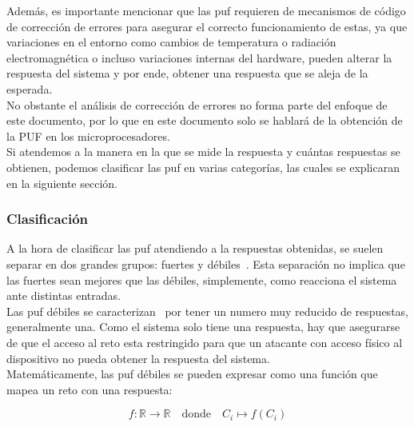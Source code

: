 \documentclass[spanish]{template/minim}
\begin{document}
Además, es importante mencionar que las \gls{puf} requieren de mecanismos de código de corrección de errores para asegurar el correcto funcionamiento de estas, ya que variaciones en el entorno como cambios de temperatura o radiación electromagnética o incluso variaciones internas del hardware, pueden alterar la respuesta del sistema y por ende, obtener una respuesta que se aleja de la esperada.\\

No obstante el análisis de corrección de errores no forma parte del enfoque de este documento, por lo que en este documento solo se hablará de la obtención de la PUF en los microprocesadores.\\

Si atendemos a la manera en la que se mide la respuesta y cuántas respuestas se obtienen, podemos clasificar las \gls{puf} en varias categorías, las cuales se explicaran en la siguiente sección.\\


\subsubsection{Clasificación}

A la hora de clasificar las \gls{puf} atendiendo a la respuestas obtenidas, se suelen separar en dos grandes grupos: {\color{accent}fuertes} y {\color{accent}débiles}~. Esta separación no implica que las fuertes sean mejores que las débiles, simplemente, como reacciona el sistema ante distintas entradas. \\

Las \gls{puf} débiles se caracterizan~\cite{puf_glance} por tener un numero muy reducido de respuestas, generalmente una. Como el sistema solo tiene una respuesta, hay que asegurarse de que el acceso al reto esta restringido para que un atacante con acceso físico al dispositivo no pueda obtener la respuesta del sistema.\\

Matemáticamente, las \gls{puf} débiles se pueden expresar como una función que mapea un reto con una respuesta:

\begin{equation}
    f : \mathbb{R} \rightarrow \mathbb{R} \quad \text{donde} \quad C_i \mapsto f(C_i)
    \label{eq:weak_puf}
\end{equation}
\end{document}
